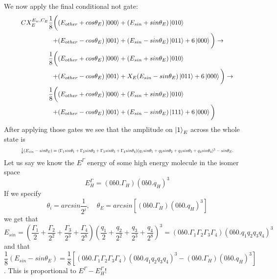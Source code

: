 \documentclass{article}
\begin{document}
\noindent
We now apply the final conditional not gate:
\begin{equation}
   \resizebox{.9\hsize}{!}{$\begin{split}
        CX_{E}^{E_w,C_E}\frac{1}{8}\bigg(
        &(E_{other}+cos\theta_E)\ket{000}+(E_{sin}+sin\theta_E)\ket{010}\\+
        &(E_{other}-cos\theta_E)\ket{001}+(E_{sin}-sin\theta_E)\ket{011}+6\ket{000}\bigg)\to\\
        \frac{1}{8}\bigg(
        &(E_{other}+cos\theta_E)\ket{000}+(E_{sin}+sin\theta_E)\ket{010}\\+
        &(E_{other}-cos\theta_E)\ket{001}+X_{E}(E_{sin}-sin\theta_E)\ket{011}+6\ket{000}\bigg)\to\\
        \frac{1}{8}\bigg(
        &(E_{other}+cos\theta_E)\ket{000}+(E_{sin}+sin\theta_E)\ket{010}\\+
        &(E_{other}-cos\theta_E)\ket{001}+(E_{sin}-sin\theta_E)\ket{111}+6\ket{000}\bigg)\\
   \end{split}$}
\end{equation}
After applying those gates we see that the amplitude on $\ket{1}_{E}$ across the whole state is 
\begin{equation*}
   \resizebox{.9\hsize}{!}{$\frac{1}{8}(E_{sin}-sin\theta_E)=(\Gamma_1sin\theta_1+\Gamma_2sin\theta_2+\Gamma_3sin\theta_3+\Gamma_4sin\theta_4)(q_1sin\theta_1+q_2sin\theta_2+q_3sin\theta_3+q_4sin\theta_4)^3-sin\theta_E.$}
\end{equation*}
Let us say we know the $E^\Gamma$ energy of some high energy molecule in the isomer space $$E^\Gamma_H = (0b0.\Gamma_H)(0b0.q_H)^3$$
If we specify 
$$\theta_i=arcsin\frac{1}{2^i},\quad\theta_E=arcsin[(0b0.\Gamma_H)(0b0.q_H)^3]$$ 
we get that $$E_{sin}=(\frac{\Gamma_1}{2}+\frac{\Gamma_2}{2^2}+\frac{\Gamma_3}{2^3}+\frac{\Gamma_4}{2^8})(\frac{q_1}{2}+\frac{q_2}{2^2}+\frac{q_3}{2^3}+\frac{q_4}{2^8})^3=(0b0.\Gamma_1\Gamma_2\Gamma_3\Gamma_4)(0b0.q_1q_2q_3q_4)^3$$ and that $$\frac{1}{8}(E_{sin}-sin\theta_E)=\frac{1}{8}[(0b0.\Gamma_1\Gamma_2\Gamma_3\Gamma_4)(0b0.q_1q_2q_3q_4)^3-(0b0.\Gamma_H)(0b0.q_H)^3]$$. This is proportional to $E^\Gamma-E^\Gamma_H$! 
\end{document}
